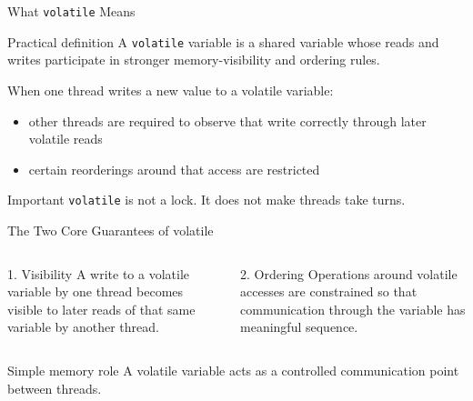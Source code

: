 \documentclass[aspectratio=169,11pt]{beamer}
\begin{document}
	\begin{frame}{What \texttt{volatile} Means}
		\begin{block}{Practical definition}
			A \texttt{volatile} variable is a shared variable whose reads and writes participate in stronger memory-visibility and ordering rules.
		\end{block}
		
		\vspace{0.3cm}
		
		When one thread writes a new value to a volatile variable:
		\begin{itemize}
			\item other threads are required to observe that write correctly through later volatile reads
			\item certain reorderings around that access are restricted
		\end{itemize}
		
		\vspace{0.3cm}
		
		\begin{alertblock}{Important}
			\texttt{volatile} is not a lock.  
			It does not make threads take turns.
		\end{alertblock}
	\end{frame}
	
	\begin{frame}{The Two Core Guarantees of volatile}
		\begin{columns}[T]
			\begin{block}{1. Visibility}
				A write to a volatile variable by one thread becomes visible to later reads of that same variable by another thread.
			\end{block}
			
			\begin{block}{2. Ordering}
				Operations around volatile accesses are constrained so that communication through the variable has meaningful sequence.
			\end{block}
		\end{columns}
		
		\vspace{0.35cm}
		
		\begin{exampleblock}{Simple memory role}
			A volatile variable acts as a controlled communication point between threads.
		\end{exampleblock}
	\end{frame}
	
\end{document}
